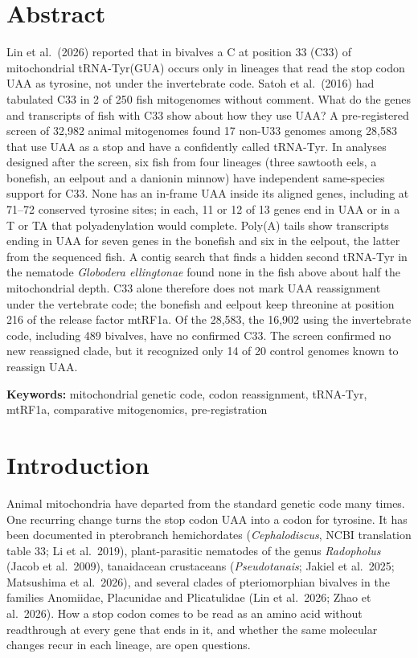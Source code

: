 \documentclass[11pt, a4paper]{article}
\begin{document}
\section*{Abstract}
Lin et al.\ (2026) reported that in bivalves a C at position 33 (C33) of mitochondrial tRNA-Tyr(GUA) occurs only in lineages that read the stop codon UAA as tyrosine, not under the invertebrate code. Satoh et al.\ (2016) had tabulated C33 in 2 of 250 fish mitogenomes without comment. What do the genes and transcripts of fish with C33 show about how they use UAA? A pre-registered screen of 32,982 animal mitogenomes found 17 non-U33 genomes among 28,583 that use UAA as a stop and have a confidently called tRNA-Tyr. In analyses designed after the screen, six fish from four lineages (three sawtooth eels, a bonefish, an eelpout and a danionin minnow) have independent same-species support for C33. None has an in-frame UAA inside its aligned genes, including at 71--72 conserved tyrosine sites; in each, 11 or 12 of 13 genes end in UAA or in a T or TA that polyadenylation would complete. Poly(A) tails show transcripts ending in UAA for seven genes in the bonefish and six in the eelpout, the latter from the sequenced fish. A contig search that finds a hidden second tRNA-Tyr in the nematode \textit{Globodera ellingtonae} found none in the fish above about half the mitochondrial depth. C33 alone therefore does not mark UAA reassignment under the vertebrate code; the bonefish and eelpout keep threonine at position 216 of the release factor mtRF1a. Of the 28,583, the 16,902 using the invertebrate code, including 489 bivalves, have no confirmed C33. The screen confirmed no new reassigned clade, but it recognized only 14 of 20 control genomes known to reassign UAA.

\vspace{0.5em}
\noindent\textbf{Keywords:} mitochondrial genetic code, codon reassignment, tRNA-Tyr, mtRF1a, comparative mitogenomics, pre-registration

\section{Introduction}
Animal mitochondria have departed from the standard genetic code many times. One recurring change turns the stop codon UAA into a codon for tyrosine. It has been documented in pterobranch hemichordates (\textit{Cephalodiscus}, NCBI translation table 33; Li et al.\ 2019), plant-parasitic nematodes of the genus \textit{Radopholus} (Jacob et al.\ 2009), tanaidacean crustaceans (\textit{Pseudotanais}; Jakiel et al.\ 2025; Matsushima et al.\ 2026), and several clades of pteriomorphian bivalves in the families Anomiidae, Placunidae and Plicatulidae (Lin et al.\ 2026; Zhao et al.\ 2026). How a stop codon comes to be read as an amino acid without readthrough at every gene that ends in it, and whether the same molecular changes recur in each lineage, are open questions.
\end{document}
